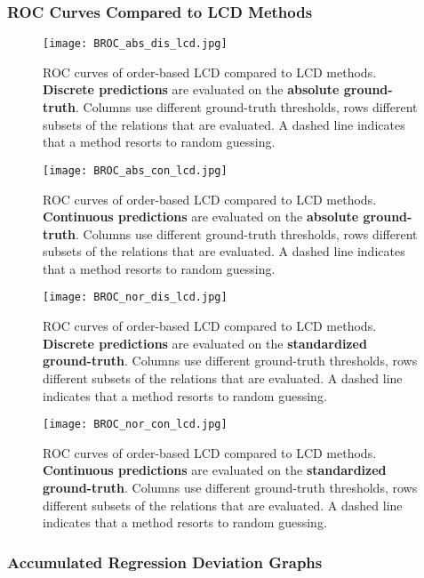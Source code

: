 \subsubsection{ROC Curves Compared to LCD Methods}

\begin{figure}[H]
    \centering
    \texttt{[image: BROC\_abs\_dis\_lcd.jpg]}
    \caption{ROC curves of order-based LCD compared to LCD methods. \textbf{Discrete predictions} are evaluated on the \textbf{absolute ground-truth}. Columns use different ground-truth thresholds, rows different subsets of the relations that are evaluated. A dashed line indicates that a method resorts to random guessing.}
\end{figure}
\begin{figure}[H]
    \centering
    \texttt{[image: BROC\_abs\_con\_lcd.jpg]}
    \caption{ROC curves of order-based LCD compared to LCD methods. \textbf{Continuous predictions} are evaluated on the \textbf{absolute ground-truth}. Columns use different ground-truth thresholds, rows different subsets of the relations that are evaluated. A dashed line indicates that a method resorts to random guessing.}
\end{figure}
\begin{figure}[H]
    \centering
    \texttt{[image: BROC\_nor\_dis\_lcd.jpg]}
    \caption{ROC curves of order-based LCD compared to LCD methods. \textbf{Discrete predictions} are evaluated on the \textbf{standardized ground-truth}. Columns use different ground-truth thresholds, rows different subsets of the relations that are evaluated. A dashed line indicates that a method resorts to random guessing.}
    \label{fig:app:rocversteeg}
\end{figure}
\begin{figure}[H]
    \centering
    \texttt{[image: BROC\_nor\_con\_lcd.jpg]}
    \caption{ROC curves of order-based LCD compared to LCD methods. \textbf{Continuous predictions} are evaluated on the \textbf{standardized ground-truth}. Columns use different ground-truth thresholds, rows different subsets of the relations that are evaluated. A dashed line indicates that a method resorts to random guessing.}
\end{figure}


\subsubsection{Accumulated Regression Deviation Graphs}

